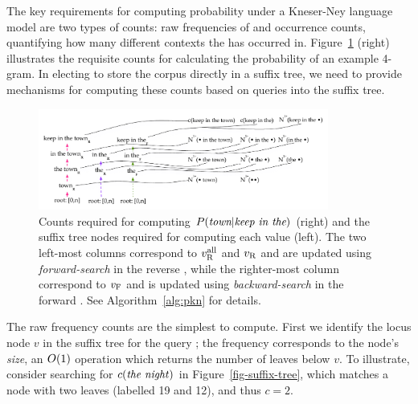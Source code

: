 
The key requirements for computing probability under a Kneser-Ney language model are two types of counts: raw frequencies of \ngrams and occurrence counts, quantifying how many different contexts the \ngram has occurred in.
Figure~\ref{fig-counts-example} (right) illustrates the requisite
counts for calculating the probability of an example 4-gram.
In electing to store the corpus directly in a suffix tree, we need to provide mechanisms for computing these counts based on queries into the suffix tree.

\begin{figure}[tpb]
\centering
\includegraphics[width=0.85\textwidth]{figures/kn_dual_cst}
\vspace{-3ex}
\caption{Counts required for computing $P(\text{\em town} | \text{\em keep in the})$ (right) and the suffix tree nodes required for computing each value (left). The two left-most columns correspond to $v_{\text{R}}^{\text{all}}$ and $v_{\text{R}}$ and are updated using \emph{forward-search} in the reverse \CST, while the righter-most column correspond to $v_{\text{F}}$ and is updated using \emph{backward-search} in the forward \CST. See Algorithm~\ref{alg:pkn} for details.}
\label{fig-counts-example}
\end{figure}


The raw frequency counts are the simplest to compute. First we
identify the locus node $v$ in the suffix tree for the query
\ngram; the frequency corresponds to the node's \emph{size}, an $O(1)$ 
operation which returns the number of leaves below $v$. To illustrate, consider
searching for $c(\text{\emph{the night}})$ in  Figure~\ref{fig-suffix-tree}, which
matches a node with two leaves (labelled 19 and 12), and thus $c=2$. 

